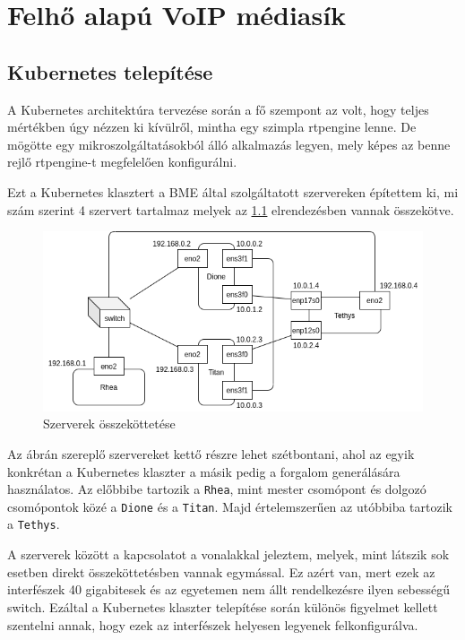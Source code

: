 \chapter{Felhő alapú VoIP médiasík}

\section{Kubernetes telepítése}

A Kubernetes architektúra tervezése során a fő szempont az volt, hogy teljes mértékben 
úgy nézzen ki kívülről, mintha egy szimpla rtpengine lenne. De mögötte egy 
mikroszolgáltatásokból álló alkalmazás legyen, mely képes az benne rejlő rtpengine-t 
megfelelően konfigurálni.

Ezt a Kubernetes klasztert a BME által szolgáltatott szervereken építettem ki, mi szám 
szerint 4 szervert tartalmaz melyek az \ref{fig:servers} elrendezésben vannak összekötve.

\begin{figure}[!ht]
	\centering
	\includegraphics[width=1\textwidth, keepaspectratio]{figures/servers.png}
	\caption{Szerverek összeköttetése}
	\label{fig:servers}
\end{figure}

Az ábrán szereplő szervereket kettő részre lehet szétbontani, ahol az egyik
konkrétan a Kubernetes klaszter a másik pedig a forgalom generálására használatos.
Az előbbibe tartozik a \texttt{Rhea}, mint mester csomópont és dolgozó csomópontok közé 
a \texttt{Dione} és a \texttt{Titan}. Majd értelemszerűen az utóbbiba tartozik a 
\texttt{Tethys}. 

A szerverek között a kapcsolatot a vonalakkal jeleztem, melyek, mint látszik
sok esetben direkt összeköttetésben vannak egymással. Ez azért van, mert ezek
az interfészek 40 gigabitesek és az egyetemen nem állt rendelkezésre ilyen 
sebességű switch. Ezáltal a Kubernetes klaszter telepítése során különös figyelmet
kellett szentelni annak, hogy ezek az interfészek helyesen legyenek felkonfigurálva.

